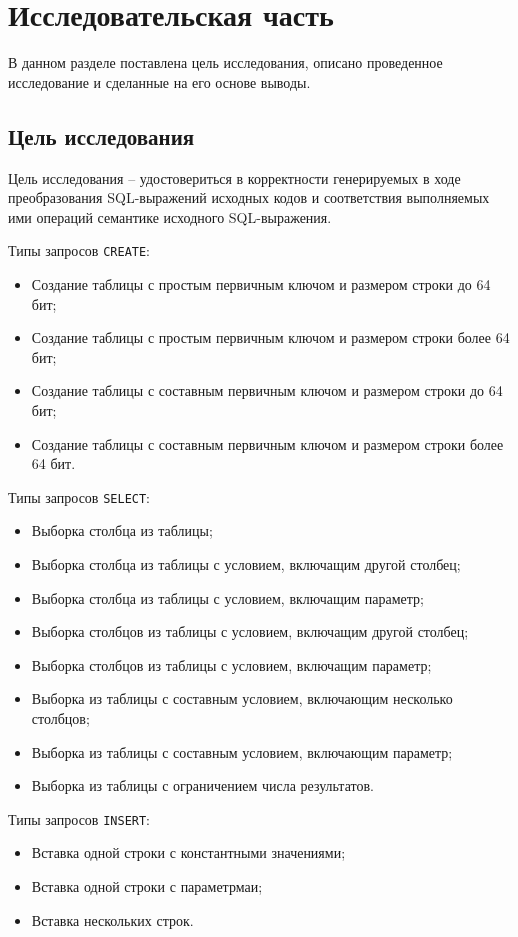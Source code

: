 \chapter{Исследовательская часть}
В данном разделе поставлена цель исследования, описано проведенное исследование и сделанные на его основе выводы.

\section{Цель исследования}
Цель исследования -- удостовериться в корректности генерируемых в ходе преобразования SQL-выражений исходных кодов и соответствия выполняемых ими операций семантике исходного SQL-выражения.

Типы запросов \texttt{CREATE}:
\begin{itemize}
	\item Создание таблицы с простым первичным ключом и размером строки до 64 бит;
	\item Создание таблицы с простым первичным ключом и размером строки более 64 бит;
	\item Создание таблицы с составным первичным ключом и размером строки до 64 бит;
	\item Создание таблицы с составным первичным ключом и размером строки более 64 бит.
\end{itemize}

Типы запросов \texttt{SELECT}:
\begin{itemize}
	\item Выборка столбца из таблицы;
	\item Выборка столбца из таблицы с условием, включащим другой столбец;
	\item Выборка столбца из таблицы с условием, включащим параметр;
	\item Выборка столбцов из таблицы с условием, включащим другой столбец;
	\item Выборка столбцов из таблицы с условием, включащим параметр;
	\item Выборка из таблицы с составным условием, включающим несколько столбцов;
	\item Выборка из таблицы с составным условием, включающим параметр;
	\item Выборка из таблицы с ограничением числа результатов.
\end{itemize}

Типы запросов \texttt{INSERT}:
\begin{itemize}
	\item Вставка одной строки с константными значениями;
	\item Вставка одной строки с параметрмаи;
	\item Вставка нескольких строк.
\end{itemize}

